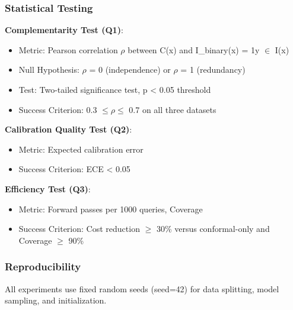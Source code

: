 \subsubsection{Statistical Testing}

\textbf{Complementarity Test (Q1)}:
\begin{itemize}
\item Metric: Pearson correlation $\rho$ between C(x) and I\_binary(x) = 1{y $\in$ I(x)}
\item Null Hypothesis: $\rho$ = 0 (independence) or $\rho$ = 1 (redundancy)
\item Test: Two-tailed significance test, p < 0.05 threshold
\item Success Criterion: 0.3 $\leq \rho \leq$ 0.7 on all three datasets
\end{itemize}

\textbf{Calibration Quality Test (Q2)}:
\begin{itemize}
\item Metric: Expected calibration error
\item Success Criterion: ECE < 0.05
\end{itemize}

\textbf{Efficiency Test (Q3)}:
\begin{itemize}
\item Metric: Forward passes per 1000 queries, Coverage
\item Success Criterion: Cost reduction $\geq$ 30\% versus conformal-only and Coverage $\geq$ 90\%
\end{itemize}

\subsubsection{Reproducibility}

All experiments use fixed random seeds (seed=42) for data splitting, model sampling, and initialization.
